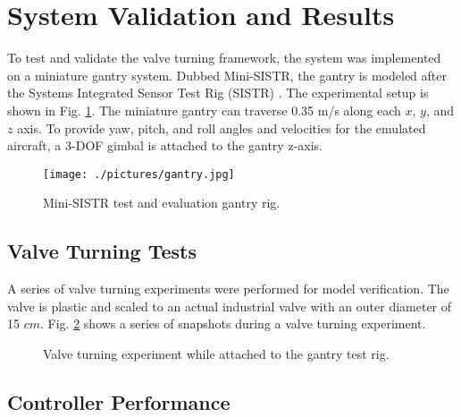 \section{System Validation and Results}\label{sec:validation}

To test and validate the valve turning framework, the system was implemented on a miniature gantry system. Dubbed Mini-SISTR, the gantry is modeled after the Systems Integrated Sensor Test Rig (SISTR) \cite{Korpela2014}. The experimental setup is shown in Fig. \ref{fig:gantry-quad}. The miniature gantry can traverse 0.35 m/s along each $x$, $y$, and $z$ axis. To provide yaw, pitch, and roll angles and velocities for the emulated aircraft, a 3-DOF gimbal is attached to the gantry z-axis. 

\begin{figure}
	\centering
	\texttt{[image: ./pictures/gantry.jpg]}
	\caption{Mini-SISTR test and evaluation gantry rig.}
	\label{fig:gantry-quad}
\end{figure}

\subsection{Valve Turning Tests}

A series of valve turning experiments were performed for model verification. The valve is plastic and scaled to an actual industrial valve with an outer diameter of 15 $cm$. Fig. \ref{fig:valve-turn-test} shows a series of snapshots during a valve turning experiment. 

\begin{figure}[b]
	\centering
	{
	\vfil
	\vfil
	}
	\caption{Valve turning experiment while attached to the gantry test rig.}
	\label{fig:valve-turn-test}
\end{figure}

\subsection{Controller Performance}

